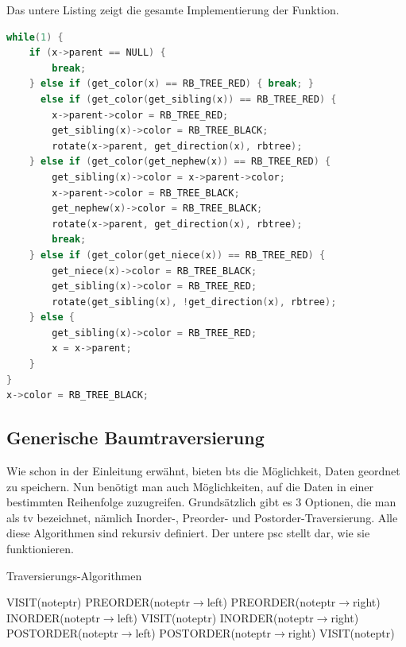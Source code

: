 \documentclass[11pt]{article}
\begin{document}
Das untere Listing zeigt die gesamte Implementierung der Funktion.

\begin{lstlisting}[language=C]
while(1) {
    if (x->parent == NULL) {
        break;
    } else if (get_color(x) == RB_TREE_RED) { break; } 
      else if (get_color(get_sibling(x)) == RB_TREE_RED) {
        x->parent->color = RB_TREE_RED;
        get_sibling(x)->color = RB_TREE_BLACK;
        rotate(x->parent, get_direction(x), rbtree);
    } else if (get_color(get_nephew(x)) == RB_TREE_RED) {
        get_sibling(x)->color = x->parent->color;
        x->parent->color = RB_TREE_BLACK;
        get_nephew(x)->color = RB_TREE_BLACK;
        rotate(x->parent, get_direction(x), rbtree);
        break;
    } else if (get_color(get_niece(x)) == RB_TREE_RED) {
        get_niece(x)->color = RB_TREE_BLACK;
        get_sibling(x)->color = RB_TREE_RED;
        rotate(get_sibling(x), !get_direction(x), rbtree);
    } else {
        get_sibling(x)->color = RB_TREE_RED;
        x = x->parent;
    }
}
x->color = RB_TREE_BLACK;
\end{lstlisting}
\cite{YTDelete}

\subsection{Generische Baumtraversierung} \label{tr}
Wie schon in der Einleitung erwähnt, bieten \glspl{bt} die Möglichkeit, Daten geordnet zu speichern. Nun benötigt man auch Möglichkeiten, auf die Daten in einer bestimmten Reihenfolge zuzugreifen. Grundsätzlich gibt es 3 Optionen, die man als \gls{tv} bezeichnet, nämlich Inorder-, Preorder- und Postorder-Traversierung.
Alle diese Algorithmen sind rekursiv definiert. \cite[S. 44ff]{aic}  Der untere \gls{psc} stellt dar, wie sie funktionieren.

\begin{algorithm}
  \caption{Traversierungs-Algorithmen}
  \begin{algorithmic}[1]
      \Return
    \EndIf
    \State VISIT(noteptr)
    \State PREORDER(noteptr$\rightarrow$left)
    \State PREORDER(noteptr$\rightarrow$right)
  \EndProcedure
      \Return
    \EndIf
    \State INORDER(noteptr$\rightarrow$left)
    \State VISIT(noteptr)
    \State INORDER(noteptr$\rightarrow$right)
  \EndProcedure
      \Return
    \EndIf
    \State POSTORDER(noteptr$\rightarrow$left)
    \State POSTORDER(noteptr$\rightarrow$right)
    \State VISIT(noteptr)
  \EndProcedure
  \end{algorithmic}
\end{algorithm}
\cite[S. 318ff]{aop}
\end{document}
